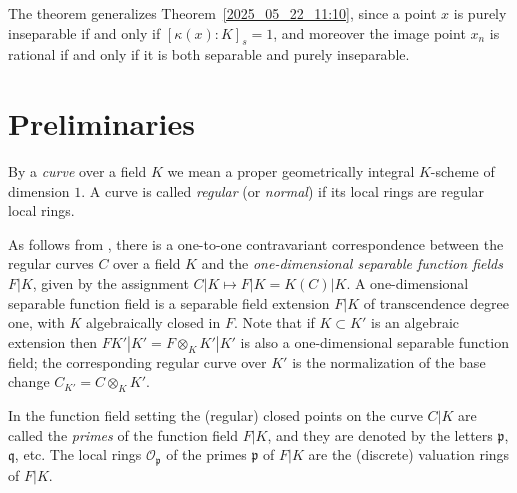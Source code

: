 \documentclass[12pt,reqno]{amsart}%
\theoremstyle{definition}
\theoremstyle{remark}
\newcommand{\su}{\subset}
\newcommand{\OO}{\mathcal{O}}
\newcommand{\pp}{\mathfrak{p}}
\newcommand{\fq}{\mathfrak{q}}
\newcommand{\ka}{\kappa}
\begin{document}
The theorem generalizes Theorem~\ref{2025_05_22_11:10}, since a point $x$ is purely inseparable if and only if $[\ka(x):K]_s = 1$, and moreover the image point $x_n$ is rational if and only if it is both separable and purely inseparable.



\section{Preliminaries}

By a \emph{curve} over a field $K$ we mean a proper geometrically integral $K$-scheme of dimension $1$.
A curve is called \emph{regular} (or \emph{normal}) if its local rings are regular local rings.

As follows from \cite[7.4]{EGA2}, there is a one-to-one contravariant correspondence between the regular curves $C$ over a field $K$ and the \emph{one-dimensional separable function fields} $F|K$, given by the assignment $C|K \mapsto F|K = K(C)|K$.
A one-dimensional separable function field is a separable field extension $F|K$ of transcendence degree one, with $K$ algebraically closed in $F$.
Note that if $K \su K'$ is an algebraic extension then $FK'|K' = F \otimes_K K' | K'$ is also a one-dimensional separable function field; the corresponding regular curve over $K'$ is the normalization of the base change $C_{K'} = C \otimes_K K'$.

In the function field setting the (regular) closed points on the curve $C|K$ are called the \emph{primes} of the function field $F|K$,
and they are denoted by the letters $\pp$, $\fq$, etc. 
The local rings $\OO_\pp$ of the primes $\pp$ of $F|K$ are the (discrete) valuation rings of $F|K$.

\end{document}

